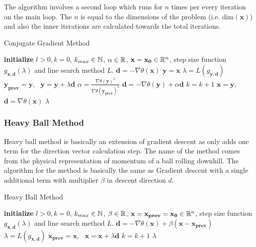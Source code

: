\documentclass[a4paper,english,titlepage,12pt]{article}
\newcommand{\vect}[1]{\ensuremath{\mathbf{#1}}}
\newcommand{\norm}[1]{\ensuremath\Vert #1 \Vert}
\newcommand{\R}{\ensuremath\mathbb{R}}
\newcommand{\N}{\ensuremath\mathbb{N}}
\begin{document}
The algorithm involves a second loop which runs for $n$ times per every iteration on the main loop. The $n$ is equal to the dimensions of the problem (i.e. $\mathrm{dim}(\vect{x})$) and also the inner iterations are calculated towards the total iterations.

\begin{algorithm}[H]
\caption{Conjugate Gradient Method}
\label{alg_conjugate_gradient}
\begin{algorithmic}[1]
\STATE \textbf{initialize} $l > 0, k = 0$, $k_{max} \in \N$, $\alpha \in \R$, $\vect{x} = \vect{x_0} \in \R^n$, step size function $g_{\vect{x}, \vect{d}}(\lambda)$ and line search method $L$.
\STATE $\vect{d} = -\nabla \theta(\vect{x})$
\WHILE{$\norm{\nabla \theta(\vect{x})} > l$ \AND $k < k_{max}$}
    \STATE $\vect{y} = \vect{x}$
        \STATE $\lambda = L(g_{\vect{y}, \vect{d}})$
        \STATE $\vect{y_{prev}} = \vect{y}$, \ $\vect{y} = \vect{y} + \lambda \vect{d}$
        \STATE $\alpha = \frac{\nabla \theta(\vect{y})^2}{\nabla \theta(\vect{y_{prev}})^2}$
        \STATE $\vect{d} = -\nabla \theta(\vect{y}) + \alpha \vect{d}$
        \STATE $k = k + 1$
    \ENDFOR
    \STATE $\vect{x} = \vect{y}$, \ $\vect{d} = \nabla \theta(\vect{x})$
\ENDWHILE
\RETURN $\lambda$
\end{algorithmic}
\end{algorithm}


\subsubsection{Heavy Ball Method}


Heavy ball method is basically an extension of gradient descent as only adds one term for the direction vector calculation step. The name of the method comes from the  physical representation of momentum of a ball rolling downhill. The algorithm for the method is basically the same as Gradient descent with a single additional term with multiplier $\beta$ in descent direction $d$.

\begin{algorithm}[H]
\caption{Heavy Ball Method}
\label{alg_heavy_ball}
\begin{algorithmic}[1]
\STATE \textbf{initialize} $l > 0, k = 0$, $k_{max} \in \N$, $\beta \in \R$, $\vect{x} = \vect{x_{prev}} = \vect{x_0} \in \R^n$, step size function $g_{\vect{x}, \vect{d}}(\lambda)$ and line search method $L$.
\WHILE{$\norm{\nabla \theta(\vect{x})} > l$ \AND $k < k_{max}$}
    \STATE $\vect{d} = -\nabla \theta(\vect{x}) + \beta (\vect{x} - \vect{x_{prev}})$
    \STATE $\lambda = L(g_{\vect{x}, \vect{d}})$
    \STATE $\vect{x_{prev}} = \vect{x}$, \ $\vect{x} = \vect{x} + \lambda \vect{d}$
    \STATE $k = k + 1$
\ENDWHILE
\RETURN $\lambda$
\end{algorithmic}
\end{algorithm}
\end{document}

